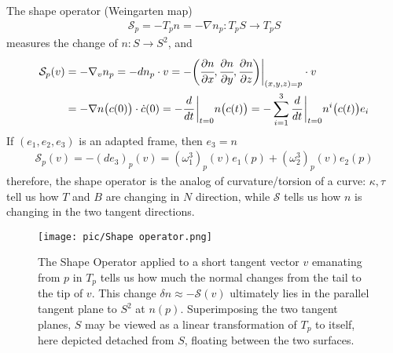 \documentclass[10pt]{article}
\begin{document}
		\begin{definition}\label{Definition: Shape operator}
			The shape operator (Weingarten map)
			\begin{equation*}
				\begin{aligned}
					\mathcal{S}_p = -T_pn = -\nabla n_p: T_pS\rightarrow T_pS
				\end{aligned}
			\end{equation*}
			measures the change of $n: S\rightarrow S^2$, and
			\begin{equation*}
				\begin{aligned}
					\mathcal{S}_p(v) &= -\nabla_v n_p = -dn_p\cdot v = -\bigg(\cfrac{\partial n}{\partial x}, \cfrac{\partial n}{\partial y}, \cfrac{\partial n}{\partial z}\bigg)\bigg|_{(x,y,z)=p}\cdot v \\
					&= -\nabla n\big(c(0)\big)\cdot\dot{c}(0) = -\cfrac{d}{dt}\thinspace\bigg|_{t=0}n\big(c(t)\big) = -\sum\limits_{i=1}^3\cfrac{d}{dt}\thinspace\bigg|_{t=0}n^i\big(c(t)\big)e_i
				\end{aligned}
			\end{equation*}
			If $(e_1, e_2, e_3)$ is an adapted frame, then $e_3 = n$
			\begin{equation*}
				\begin{aligned}
					\mathcal{S}_p(v) = -(de_3)_p(v) = (\omega_1^3)_p(v)e_1(p) + (\omega_2^3)_p(v)e_2(p)
				\end{aligned}
			\end{equation*}
			therefore, the shape operator is the analog of curvature/torsion of a curve: $\kappa, \tau$ tell us how $T$ and $B$ are changing in $N$ direction, while $\mathcal{S}$ tells us how $n$ is changing in the two tangent directions.
		\end{definition}

            \begin{figure}[H]
                \centering
                \texttt{[image: pic/Shape operator.png]}
                \caption{The Shape Operator applied to a short tangent vector $v$ emanating from $p$ in $T_p$ tells us how much the normal changes from the tail to the tip of $v$. This change $\delta n \approx -\mathcal{S}(v)$ ultimately lies in the parallel tangent plane to $S^2$ at $n(p)$. Superimposing the two tangent planes, $S$ may be viewed as a linear transformation of $T_p$ to itself, here depicted detached from $S$, floating between the two surfaces.}
            \end{figure}
\end{document}
